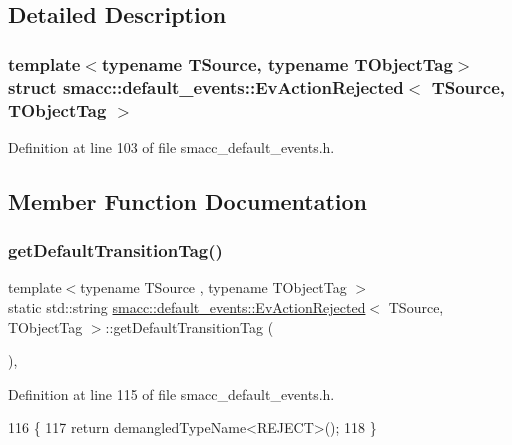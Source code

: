 \subsection{Detailed Description}
\subsubsection*{template$<$typename T\+Source, typename T\+Object\+Tag$>$\newline
struct smacc\+::default\+\_\+events\+::\+Ev\+Action\+Rejected$<$ T\+Source, T\+Object\+Tag $>$}



Definition at line 103 of file smacc\+\_\+default\+\_\+events.\+h.



\subsection{Member Function Documentation}
\mbox{\label{structsmacc_1_1default__events_1_1EvActionRejected_af826dc01da958697898f0f70801f87d6}} 
\subsubsection{\texorpdfstring{get\+Default\+Transition\+Tag()}{getDefaultTransitionTag()}}
{\footnotesize\ttfamily template$<$typename T\+Source , typename T\+Object\+Tag $>$ \\
static std\+::string \hyperlink{structsmacc_1_1default__events_1_1EvActionRejected}{smacc\+::default\+\_\+events\+::\+Ev\+Action\+Rejected}$<$ T\+Source, T\+Object\+Tag $>$\+::get\+Default\+Transition\+Tag (\begin{DoxyParamCaption}{ }\end{DoxyParamCaption})\hspace{0.3cm}{\ttfamily [inline]}, {\ttfamily [static]}}



Definition at line 115 of file smacc\+\_\+default\+\_\+events.\+h.


\begin{DoxyCode}
116   \{
117     \textcolor{keywordflow}{return} demangledTypeName<REJECT>();
118   \}
\end{DoxyCode}
\mbox{\label{structsmacc_1_1default__events_1_1EvActionRejected_a2ab427b06156f1c1776cb93d0277c025}} 

